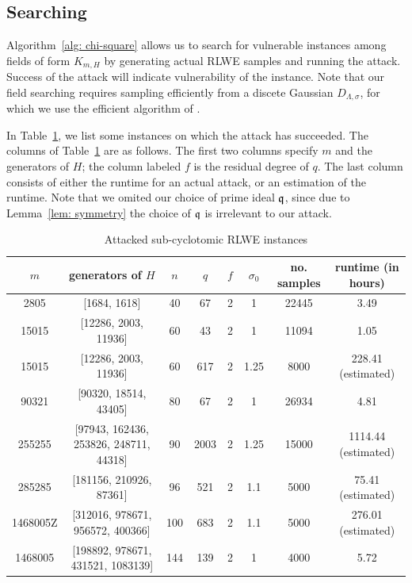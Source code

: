 \documentclass{amsart}
\begin{document}
\subsection{Searching}

Algorithm~\ref{alg: chi-square} allows us to search for vulnerable instances among fields of form $K_{m,H}$ by generating actual RLWE samples and running the attack. Success of the attack will indicate vulnerability of the instance. Note that our field searching requires sampling efficiently from a discete Gaussian $D_{\Lambda, \sigma}$, for which we use the efficient algorithm of \cite{gentry2008trapdoors}.

In Table~\ref{tab: attacked}, we list some instances on which the attack has succeeded. The columns of Table~\ref{tab: attacked} are as follows. The first two columns specify $m$ and the generators of $H$; the column labeled $f$ is the residual degree of $q$. The last column consists of either the runtime for an actual attack, or an estimation of the runtime. Note that we omited our choice of prime ideal $\mathfrak{q}$, since due to Lemma~\ref{lem: symmetry} the choice of $\mathfrak{q}$ is irrelevant to our attack.

\begin{table}[H] \label{tab: attacked}
\caption{Attacked sub-cyclotomic RLWE instances}
\begin{tabular}{c|c|c|c|c|c|c|c}
$m$ & generators of $H$ & $n$ & $q$ & $f$ & $\sigma_0$ & no. samples & runtime (in hours) \\ \hline
2805 &  [1684, 1618] & 40 & 67 & 2 & 1 & 22445 & 3.49 \\
15015 & [12286, 2003, 11936] & 60 & 43 & 2 & 1 & 11094 & 1.05 \\
15015 & [12286, 2003, 11936] & 60 & 617 & 2 & 1.25 & 8000 & 228.41 (estimated) \footnotemark  \\
90321 & [90320, 18514, 43405] & 80 & 67 & 2 & 1 & 26934 & 4.81 \\
255255 &  [97943, 162436, 253826, 248711, 44318] & 90 & 2003 & 2 & 1.25 & 15000 &  1114.44 (estimated) \\
285285 & [181156, 210926, 87361] & 96 & 521  & 2 & 1.1 & 5000 & 75.41 (estimated) \\
1468005Z & [312016, 978671, 956572, 400366] & 100 & 683 & 2 & 1.1
& 5000 &  276.01 (estimated) \\
1468005 & [198892, 978671, 431521, 1083139] & 144 & 139 & 2 & 1 &  4000 &  5.72
\end{tabular}
\end{table}
\end{document}
